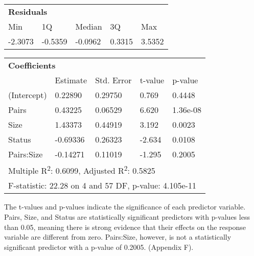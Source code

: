 \documentclass[a4paper, 12pt]{article}
\begin{document}
\begin{spacing}{1.5}
\begin{table}[h]
\begin{tabular}{lllll}
\hline
\multicolumn{5}{l}{\textbf{Residuals}}        \\
Min     & 1Q      & Median  & 3Q     & Max    \\ \hline
-2.3073 & -0.5359 & -0.0962 & 0.3315 & 3.5352 \\ \hline
\end{tabular}
\end{table}
\begin{table}[h]
\begin{tabular}{lllll}
\hline
\multicolumn{5}{l}{\textbf{Coefficients}}                                                                                                   \\
                           & Estimate                & Std. Error                & t-value                & p-value                \\ \hline
(Intercept)                & 0.22890                 & 0.29750                   & 0.769                  & 0.4448                 \\
Pairs                      & 0.43225                 & 0.06529                   & 6.620                  & 1.36e-08               \\
Size                       & 1.43373                 & 0.44919                   & 3.192                  & 0.0023                 \\
Status                     & -0.69336                & 0.26323                   & -2.634                 & 0.0108                 \\
Pairs:Size                 & -0.14271                & 0.11019                   & -1.295                 & 0.2005                 \\ \hline
\multicolumn{5}{l}{Multiple R\textsuperscript{2}: 0.6099, Adjusted R\textsuperscript{2}: 0.5825} \\
\multicolumn{5}{l}{F-statistic: 22.28 on 4 and 57 DF, p-value: 4.105e-11}                                                          \\ \hline
\end{tabular}
\begin{center}
    \vspace{1mm}
\end{center}
\end{table}

The t-values and p-values indicate the significance of each predictor variable. Pairs, Size, and Status are statistically significant predictors with p-values less than 0.05, meaning there is strong evidence that their effects on the response variable are different from zero. Pairs:Size, however, is not a statistically significant predictor with a p-value of 0.2005. (Appendix F).


\end{spacing}
\end{document}
